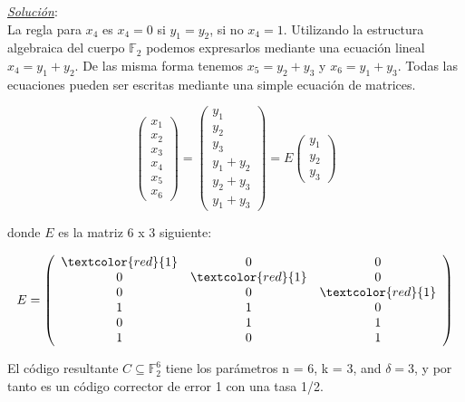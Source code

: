 \documentclass{beamer}
\theoremstyle{plain}
\theoremstyle{example}
\theoremstyle{example}
\begin{document}
\begin{frame}  \footnotesize

\textit{\underline{Solución}}:\\
\vspace{0.1cm}
La regla para $x_4$ es $x_4 =0$ si $y_1 =y_2$, si no $x_4 =1$. Utilizando la estructura algebraica del cuerpo $\mathbb{F}_2$ podemos expresarlos mediante una ecuación lineal $x_4= y_1 + y_2$. De las misma forma tenemos $x_5= y_2 + y_3$ y  $x_6= y_1 + y_3$. Todas las ecuaciones pueden ser escritas mediante una simple ecuación de matrices.


\[
            \left( \begin{array}{c}
                  x_1 \\
                  x_2  \\   
                  x_3 \\
                  x_4  \\
                  x_5 \\
                  x_6   
           			\end{array}
    		\right) = 
            \left( \begin{array}{c}
                  y_1 \\
                  y_2  \\   
                  y_3 \\
                  y_1 + y_2  \\
                  y_2 + y_3 \\
                  y_1 + y_3  
           			\end{array}
    		\right) = E
    		\left( \begin{array}{c}
                  y_1  \\                        
                  y_2  \\
                  y_3
           			\end{array}
    		\right) 		    		
\]

donde $E$ es la matriz 6 x 3 siguiente:

\[
   E=      \left( \begin{array}{ccc}
                  \textcolor{red}{1} & 0 & 0 \\
                  0 & \textcolor{red}{1} & 0  \\   
                  0 & 0 & \textcolor{red}{1} \\
                  1 & 1 & 0   \\
                  0 & 1 & 1  \\
                  1 & 0 & 1   
           			\end{array}
    		\right) 	    		
\]

El código resultante $C\subseteq \mathbb{F}_2^6$ tiene los parámetros n = 6, k = 3, and $\delta = 3$, y por tanto es un código corrector de error 1 con una tasa 1/2.

\end{frame} 
\end{document}
